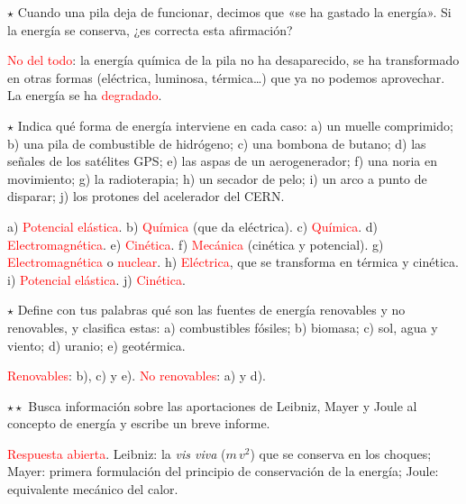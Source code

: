 \begin{exercise}
    \(\star\) Cuando una pila deja de funcionar, decimos que «se ha gastado la energía». Si la energía se conserva, ¿es correcta esta
    afirmación?
    \begin{solu}
        \textcolor{red}{No del todo}: la energía química de la pila no ha desaparecido, se ha transformado en otras formas (eléctrica,
        luminosa, térmica\dots) que ya no podemos aprovechar. La energía se ha \textcolor{red}{degradado}.
    \end{solu}
\end{exercise}

\begin{exercise}
    \(\star\) Indica qué forma de energía interviene en cada caso: a) un muelle comprimido; b) una pila de combustible de hidrógeno;
    c) una bombona de butano; d) las señales de los satélites GPS; e) las aspas de un aerogenerador; f) una noria en movimiento;
    g) la radioterapia; h) un secador de pelo; i) un arco a punto de disparar; j) los protones del acelerador del CERN.
    \begin{solu}
        a) \textcolor{red}{Potencial elástica}. b) \textcolor{red}{Química} (que da eléctrica). c) \textcolor{red}{Química}.
        d) \textcolor{red}{Electromagnética}. e) \textcolor{red}{Cinética}. f) \textcolor{red}{Mecánica} (cinética y potencial).
        g) \textcolor{red}{Electromagnética} o \textcolor{red}{nuclear}. h) \textcolor{red}{Eléctrica}, que se transforma en térmica y
        cinética. i) \textcolor{red}{Potencial elástica}. j) \textcolor{red}{Cinética}.
    \end{solu}
\end{exercise}

\begin{exercise}
    \(\star\) Define con tus palabras qué son las fuentes de energía renovables y no renovables, y clasifica estas: a) combustibles
    fósiles; b) biomasa; c) sol, agua y viento; d) uranio; e) geotérmica.
    \begin{solu}
        \textcolor{red}{Renovables}: b), c) y e). \textcolor{red}{No renovables}: a) y d).
    \end{solu}
\end{exercise}

\begin{exercise}
    \(\star\star\) Busca información sobre las aportaciones de Leibniz, Mayer y Joule al concepto de energía y escribe un breve informe.
    \begin{solu}
        \textcolor{red}{Respuesta abierta}. Leibniz: la \textit{vis viva} (\(m\,v^2\)) que se conserva en los choques; Mayer: primera
        formulación del principio de conservación de la energía; Joule: equivalente mecánico del calor.
    \end{solu}
\end{exercise}

